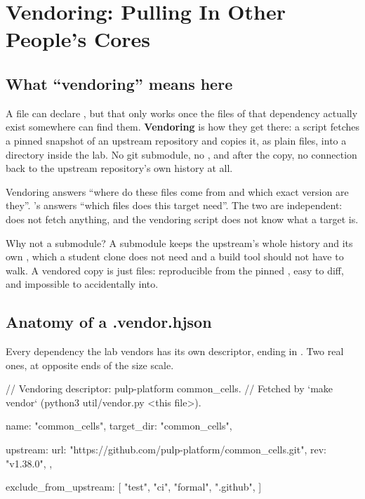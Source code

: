\chapter{Vendoring: Pulling In Other People's Cores}
\label{ch:vendoring}


\section{What ``vendoring'' means here}

A  file can declare , but
that only works once the files of that dependency actually exist somewhere
\FuseSoC can find them. \textbf{Vendoring} is how they get there: a script
fetches a pinned snapshot of an upstream repository and copies it, as plain
files, into a  directory inside the lab. No git submodule, no
, and after the copy, no connection back to the upstream
repository's own  history at all.

\begin{ruleofthumb}
Vendoring answers ``where do these files come from and which exact version
are they''. \FuseSoC's  answers ``which files does this target
need''. The two are independent: \FuseSoC does not fetch anything, and the
vendoring script does not know what a target is.
\end{ruleofthumb}

\begin{notebox}{Why not a submodule?}
A submodule keeps the upstream's whole history and its own ,
which a student clone does not need and a build tool should not have to
walk. A vendored copy is just files: reproducible from the pinned
, easy to diff, and impossible to accidentally 
into.
\end{notebox}

\section{Anatomy of a .vendor.hjson}

Every dependency the lab vendors has its own descriptor, ending in
. Two real ones, at opposite ends of the size scale.

\begin{corecode}[caption={lab1/vendor/pulp\_platform/common\_cells.vendor.hjson},label={lst:vendoring:common}]
// Vendoring descriptor: pulp-platform common_cells.
// Fetched by `make vendor` (python3 util/vendor.py <this file>).
{
  name: "common_cells",
  target_dir: "common_cells",

  upstream: {
    url: "https://github.com/pulp-platform/common_cells.git",
    rev: "v1.38.0",
  },

  exclude_from_upstream: [
    "test",
    "ci",
    "formal",
    ".github",
  ]
}
\end{corecode}

